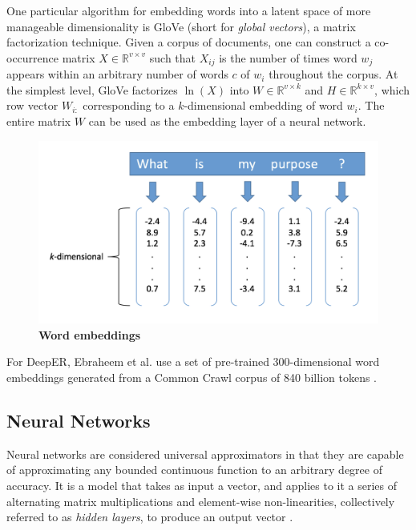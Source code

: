 \documentclass{proc}
\begin{document}
One particular algorithm for embedding words into a latent space of more manageable dimensionality is GloVe \cite{pennington-glove} (short for \textit{global vectors}), a matrix factorization technique. Given a corpus of documents, one can construct a co-occurrence matrix $X \in \mathbb{R}^{v \times v}$ such that $X_{ij}$ is the number of times word $w_j$ appears within an arbitrary number of words $c$ of $w_i$ throughout the corpus. At the simplest level, GloVe factorizes $\ln(X)$ into $W \in \mathbb{R}^{v \times k}$ and $H \in \mathbb{R}^{k \times v}$, which row vector $W_{i:}$ corresponding to a $k$-dimensional embedding of word $w_i$. The entire matrix $W$ can be used as the embedding layer of a neural network.

\begin{figure}[h!]
		\includegraphics*[scale=0.45]{../imgs/word-embeddings.png}
		\caption{\textbf{Word embeddings}}
		\label{fig:word-embeddings}
\end{figure}

For DeepER, Ebraheem et al. use a set of pre-trained 300-dimensional word embeddings generated from a Common Crawl corpus of 840 billion tokens \cite{ebraheem-deep-er}.

\subsection{Neural Networks}

Neural networks are considered universal approximators in that they are capable of approximating any bounded continuous function to an arbitrary degree of accuracy. It is a model that takes as input a vector, and applies to it a series of alternating matrix multiplications and element-wise non-linearities, collectively referred to as \textit{hidden layers}, to produce an output vector \cite{goodfellow-deep-learning}. 
\end{document}

